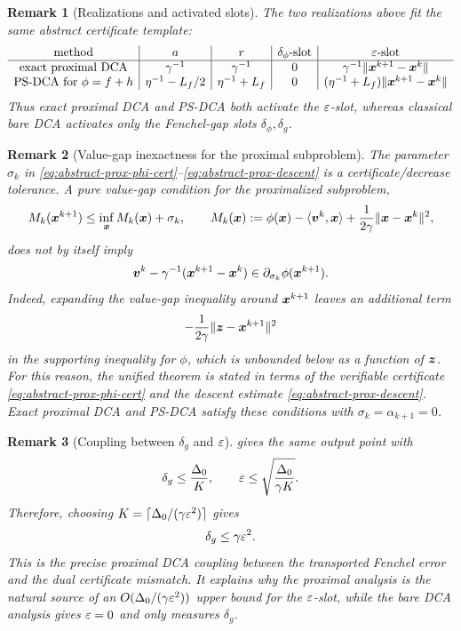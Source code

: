 \documentclass[english]{article}
\newtheorem{remark}{Remark}[section]
\begin{document}
\begin{remark}[Realizations and activated slots]
\label{rem:prox-realization-table}
The two realizations above fit the same abstract certificate template:
\[
\begin{array}{c|c|c|c|c}
\text{method}
& a
& r
& \delta_\phi\text{-slot}
& \varepsilon\text{-slot}
\\ \hline
\text{exact proximal DCA}
& \gamma^{-1}
& \gamma^{-1}
& 0
& \gamma^{-1}\|\bm{x}^{k+1}-\bm{x}^k\|
\\
\text{PS-DCA for }\phi=f+h
& \eta^{-1}-L_f/2
& \eta^{-1}+L_f
& 0
& (\eta^{-1}+L_f)\|\bm{x}^{k+1}-\bm{x}^k\|
\end{array}
\]
Thus exact proximal DCA and PS-DCA both activate the $\varepsilon$-slot,
whereas classical bare DCA activates only the Fenchel-gap slots
$\delta_\phi,\delta_g$.
\end{remark}

\begin{remark}[Value-gap inexactness for the proximal subproblem]
\label{rem:prox-value-gap-warning}
The parameter $\sigma_k$ in
\eqref{eq:abstract-prox-phi-cert}--\eqref{eq:abstract-prox-descent} is a
certificate/decrease tolerance. A pure value-gap condition for the
proximalized subproblem,
\[
    M_k(\bm{x}^{k+1})\le\inf_{\bm{x}}M_k(\bm{x})+\sigma_k,
    \qquad
    M_k(\bm{x}):=
    \phi(\bm{x})-\langle\bm{v}^k,\bm{x}\rangle
    +
    \frac{1}{2\gamma}\|\bm{x}-\bm{x}^k\|^2,
\]
does not by itself imply
\[
    \bm{v}^k-\gamma^{-1}(\bm{x}^{k+1}-\bm{x}^k)
    \in
    \partial_{\sigma_k}\phi(\bm{x}^{k+1}).
\]
Indeed, expanding the value-gap inequality around $\bm{x}^{k+1}$ leaves an
additional term
\[
    -\frac{1}{2\gamma}\|\bm{z}-\bm{x}^{k+1}\|^2
\]
in the supporting inequality for $\phi$, which is unbounded below as a
function of $\bm{z}$. For this reason, the unified theorem is stated in
terms of the verifiable certificate
\eqref{eq:abstract-prox-phi-cert} and the descent estimate
\eqref{eq:abstract-prox-descent}. Exact proximal DCA and PS-DCA satisfy
these conditions with $\sigma_k=\alpha_{k+1}=0$.
\end{remark}

\begin{remark}[Coupling between $\delta_g$ and $\varepsilon$]
\label{rem:prox-deltag-eps-coupling}
 gives the same output point with
\[
    \delta_g
    \le
    \frac{\Delta_0}{K},
    \qquad
    \varepsilon
    \le
    \sqrt{\frac{\Delta_0}{\gamma K}}.
\]
Therefore, choosing $K=\lceil\Delta_0/(\gamma\varepsilon^2)\rceil$ gives
\[
    \delta_g\le\gamma\varepsilon^2.
\]
This is the precise proximal DCA coupling between the transported
Fenchel error and the dual certificate mismatch. It explains why the
proximal analysis is the natural source of an
$O(\Delta_0/(\gamma\varepsilon^2))$ upper bound for the $\varepsilon$-slot, while the
bare DCA analysis gives $\varepsilon=0$ and only measures $\delta_g$.
\end{remark}
\end{document}
